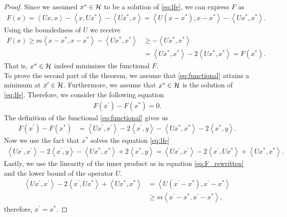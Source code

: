 \begin{proof}
Since we assumed $x^{\ast} \in \mathcal{H}$ to be a solution of \eqref{eq:lfe}, we can express $F$ as
\begin{align}\label{eq:F_rewritten}
F(x) = \left\langle Ux, x \right\rangle - \left\langle x, Ux^{\ast} \right\rangle - \left\langle Ux^{\ast}, x \right\rangle = \left\langle U(x - x^{\ast}), x - x^{\ast} \right\rangle - \left\langle Ux^{\ast}, x^{\ast} \right\rangle.
\end{align}
Using the boundedness of $U$ we receive
\begin{align}\label{eq:1.8}
F(x) \geq m\left\langle x - x^{\ast}, x - x^{\ast} \right\rangle - \left\langle Ux^{\ast}, x^{\ast} \right\rangle &\geq - \left\langle Ux^{\ast}, x^{\ast} \right\rangle\nonumber\\
&= \left\langle Ux^{\ast}, x^{\ast} \right\rangle  -2\left\langle Ux^{\ast}, x^{\ast} \right\rangle = F(x^{\ast}).
\end{align}
That is, $x^{\ast} \in \mathcal{H}$ indeed minimizes the functional $F$.\\
To prove the second part of the theorem, we assume that \eqref{eq:functional} attains a minimum at $x^{\prime} \in \mathcal{H}$. Furthermore, we assume that $x^{\ast}\in\mathcal{H}$ is the solution of \eqref{eq:lfe}. Therefore, we consider the following equation
\begin{align*}
F(x^{\prime}) - F(x^{\ast}) = 0.
\end{align*}
The definition of the functional \eqref{eq:functional} gives us
\begin{align*}
F(x^{\prime}) - F(x^{\ast}) &= \left\langle Ux^{\prime}, x^{\prime}\right\rangle -  2\left\langle x^{\prime}, y\right\rangle - \left\langle Ux^{\ast}, x^{\ast}\right\rangle - 2 \left\langle x^{\ast}, y\right\rangle.
\end{align*}
Now we use the fact that $x^{\ast}$ solves the equation \eqref{eq:lfe}
\begin{align*}
\left\langle Ux^{\prime}, x^{\prime}\right\rangle -  2\left\langle x^{\prime}, y\right\rangle - \left\langle Ux^{\ast}, x^{\ast}\right\rangle + 2 \left\langle x^{\ast}, y\right\rangle
= \left\langle Ux^{\prime}, x^{\prime}\right\rangle - 2 \left\langle x^{\prime}, Ux^{\ast}\right\rangle + \left\langle Ux^{\ast}, x^{\ast}\right\rangle.
\end{align*}
Lastly, we use the linearity of the inner product as in equation \eqref{eq:F_rewritten} and the lower bound of the operator $U$.
\begin{align*}
\left\langle Ux^{\prime}, x^{\prime}\right\rangle - 2 \left\langle x^{\prime}, Ux^{\ast}\right\rangle + \left\langle Ux^{\ast}, x^{\ast}\right\rangle &=\left\langle U(x^{\prime} - x^{\ast}), x^{\prime} - x^{\ast} \right\rangle\\
&\geq m \left\langle x^{\prime} - x^{\ast}, x^{\prime} - x^{\ast} \right\rangle,
\end{align*}
therefore, $x^{\prime} = x^{\ast}$.
\end{proof}

